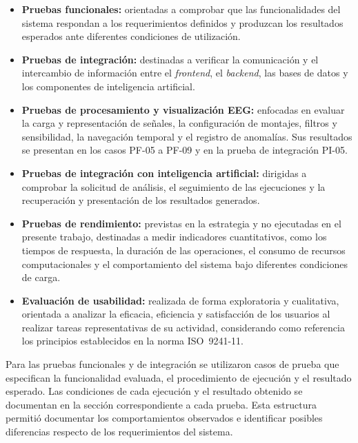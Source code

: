 \begin{itemize}
    \item \textbf{Pruebas funcionales:} orientadas a comprobar que las funcionalidades del sistema respondan a los requerimientos definidos y produzcan los resultados esperados ante diferentes condiciones de utilización.

    
    \item \textbf{Pruebas de integración:} destinadas a verificar la comunicación y el intercambio de información entre el \textit{frontend}, el \textit{backend}, las bases de datos y los componentes de inteligencia artificial.

    \item \textbf{Pruebas de procesamiento y visualización EEG:} enfocadas en evaluar la carga y representación de señales, la configuración de montajes, filtros y sensibilidad, la navegación temporal y el registro de anomalías. Sus resultados se presentan en los casos PF-05 a PF-09 y en la prueba de integración PI-05.

    \item \textbf{Pruebas de integración con inteligencia artificial:} dirigidas a comprobar la solicitud de análisis, el seguimiento de las ejecuciones y la recuperación y presentación de los resultados generados.

    \item \textbf{Pruebas de rendimiento:} previstas en la estrategia y no ejecutadas en el presente trabajo, destinadas a medir indicadores cuantitativos, como los tiempos de respuesta, la duración de las operaciones, el consumo de recursos computacionales y el comportamiento del sistema bajo diferentes condiciones de carga.

    \item \textbf{Evaluación de usabilidad:} realizada de forma exploratoria y cualitativa, orientada a analizar la eficacia, eficiencia y satisfacción de los usuarios al realizar tareas representativas de su actividad, considerando como referencia los principios establecidos en la norma ISO~9241-11.
\end{itemize}

Para las pruebas funcionales y de integración se utilizaron casos de prueba que especifican la funcionalidad evaluada, el procedimiento de ejecución y el resultado esperado. Las condiciones de cada ejecución y el resultado obtenido se documentan en la sección correspondiente a cada prueba. Esta estructura permitió documentar los comportamientos observados e identificar posibles diferencias respecto de los requerimientos del sistema.

